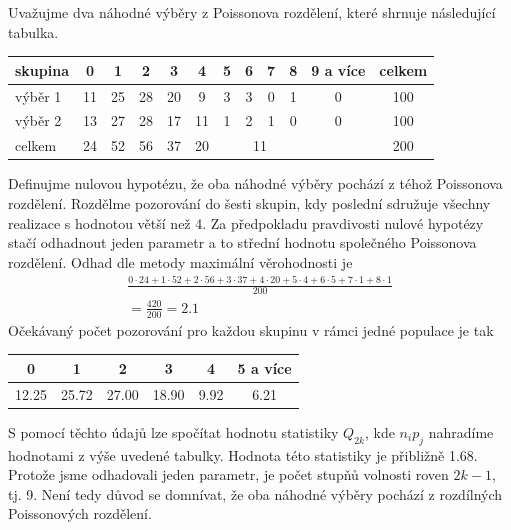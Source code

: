 \begin{example}
Uvažujme dva náhodné výběry z Poissonova rozdělení, které shrnuje následující tabulka.
\begin{center}
  \begin{tabular}{|l|c|c|c|c|c|c|c|c|c|c|c|}
    \hline
    \textbf{skupina} & \textbf{0} & \textbf{1} & \textbf{2} & \textbf{3} & \textbf{4}  & \textbf{5} & \textbf{6} & \textbf{7} & \textbf{8} & \textbf{9 a více} & \textbf{celkem}\\ 
    \hline
    \hline
    výběr 1 & 11 & 25 & 28 & 20 & 9 & 3 & 3 & 0 & 1 & 0 & 100\\
    \hline
    výběr 2 & 13 & 27 & 28 & 17 & 11 & 1 & 2 & 1 & 0 & 0 & 100\\
    \hline
    celkem & 24 & 52 & 56 & 37 & 20 & \multicolumn{4}{c}{11} & & 200\\
    \hline
  \end{tabular}
\end{center}
Definujme nulovou hypotézu, že oba náhodné výběry pochází z téhož Poissonova rozdělení. Rozdělme pozorování do šesti skupin, kdy poslední sdružuje všechny realizace s hodnotou větší než 4. Za předpokladu pravdivosti nulové hypotézy stačí odhadnout jeden parametr a to střední hodnotu společného Poissonova rozdělení. Odhad dle metody maximální věrohodnosti je
\begin{multline*}
\frac{0 \cdot 24 + 1 \cdot 52 +  2 \cdot 56 + 3 \cdot 37 + 4 \cdot 20 + 5 \cdot 4 + 6 \cdot 5 + 7 \cdot 1 + 8 \cdot 1}{200}\\
= \frac{420}{200} = 2.1
\end{multline*}
Očekávaný počet pozorování pro každou skupinu v rámci jedné populace je tak
\begin{center}
  \begin{tabular}{|c|c|c|c|c|c|}
    \hline
    \textbf{0} & \textbf{1} & \textbf{2} & \textbf{3} & \textbf{4} & \textbf{5 a více}\\
    \hline
    12.25 & 25.72 & 27.00 & 18.90 & 9.92 & 6.21\\
    \hline
  \end{tabular}
\end{center}
S pomocí těchto údajů lze spočítat hodnotu statistiky $Q_{2k}$, kde $n_i p_j$ nahradíme hodnotami z výše uvedené tabulky. Hodnota této statistiky je přibližně 1.68. Protože jsme odhadovali jeden parametr, je počet stupňů volnosti roven $2k - 1$, tj. 9. Není tedy důvod se domnívat, že oba náhodné výběry pochází z rozdílných Poissonových rozdělení.
\end{example}

